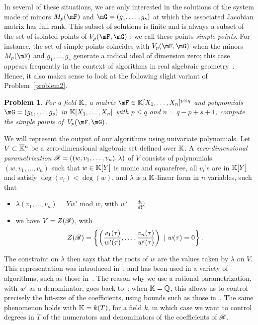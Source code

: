 \documentclass[12pt]{article}
\newtheorem{pbm}{Problem}
\begin{document}
In several of these situations, we are only interested in the
solutions of the system made of minors $M_p(\mF)$ and
$\mG=(g_1,\dots,g_s)$ at which the associated Jacobian matrix has full
rank. This subset of solutions is finite and is always a subset of the
set of isolated points of $\VpFG{p}{\mF}{\mG}$ \cite[Theorem
  16.19]{Eisenbud95}; we call these points {\em simple points}. For
instance, the set of simple points coincides with $\VpFG{p}{\mF}{\mG}$
when the minors $M_p(\mF)$ and $g_1,\dots,g_s$ generate a radical
ideal of dimension zero; this case appears frequently in the context
of algorithms in real algebraic geometry~\cite{BGHSS}.  Hence, it also
makes sense to look at the following slight variant of
Problem~\eqref{problem2}.

\begin{pbm} \label{problem3} For a field $\mathbb{K}$, a matrix
  $\mF \in \KK[X_1,\dots,X_n]^{p \times q}$ and polynomials
  $\mG=(g_1,\dots,g_s)$ in $\mathbb{K}[X_1,\dots,X_n]$ with $p \leq q$ and
  $n = q-p+s+1$, compute the simple  points of~$\VpFG{p}{\mF}{\mG}$.
\end{pbm}

We will represent the output of our algorithms using univariate
polynomials. Let $V \subset \overline{\mathbb{K}}{}^n$ be a zero-dimensional
algebraic set defined over $\mathbb{K}$. A \emph{zero-dimensional
  parametrization} $\mathscr{R} = ((w,v_1, \ldots, v_n), \lambda)$ of $V$
consists of polynomials $(w,v_1, \ldots, v_n)$ such that $w \in
\mathbb{K}[Y]$ is monic and squarefree, all $v_i$'s are in $\mathbb{K}[Y]$ and satisfy
$\deg(v_i) < \deg(w)$, and $\lambda$ is a $\mathbb{K}$-linear form in $n$
variables, such that
\begin{itemize}
\item $\lambda(v_1, \ldots, v_n) = Yw'$ mod $w$, with $w'=\frac{d w}{d Y}$;
\item we have $V = Z(\mathscr{R})$, with $$Z(\mathscr{R})= \left\{\left(\frac{v_1(\tau)}{w'(\tau)}, \ldots, \frac{v_n(\tau)}{w'(\tau)}\right) \ | \ w(\tau) = 0\right\}.$$
\end{itemize}
The constraint on $\lambda$ then says that the roots of $w$ are the
values taken by $\lambda$ on $V$. This representation was introduced
in~\cite{Kronecker82,Macaulay16}, and has been used in a variety of
algorithms, such as those
in~\cite{GiMo89,GiHeMoPa95,ABRW,GiHeMoMoPa98,Rouillier99,GiLeSa01}.
The reason why we use a rational parametrization, with $w'$ as a
denominator, goes back to~\cite{ABRW,Rouillier99,GiLeSa01}: when
$\mathbb{K}=\mathbb{Q}$, this allows us to control precisely the bit-size of the
coefficients, using bounds such as those
in~\cite{Schost03,DaSc04}. The same phenomenon holds with $\mathbb{K}=k(T)$,
for a field $k$, in which case we want to control degrees in $T$ of
the numerators and denominators of the coefficients of $\mathscr{R}$.
\end{document}

